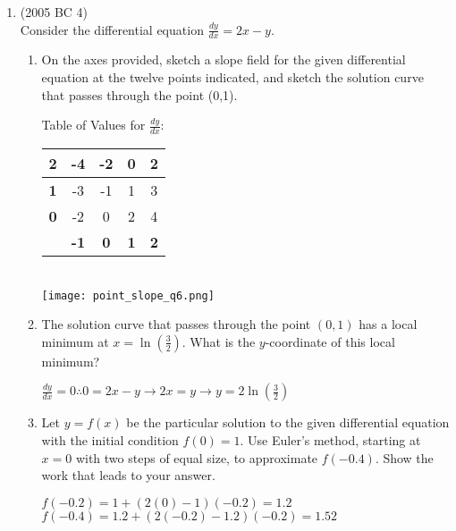 \documentclass[10pt,letterpaper]{report}
\begin{document}
\begin{enumerate}
  \item{(2005 BC 4) \\
  Consider the differential equation $\frac{dy}{dx}=2x-y$.}
  \begin{enumerate}
    \item{On the axes provided, sketch a slope field for the given differential equation at the twelve points indicated, and sketch the solution curve that passes through the point (0,1). \\}
      \begin{multicols}{2}
        Table of Values for $\frac{dy}{dx}$: \\
        \begin{tabular}{| c | c | c | c | c |} 
          \hline
          \textbf{2} & -4 & -2 & 0 & 2 \\
          \hline
          \textbf{1} & -3 & -1 & 1 & 3 \\
          \hline
          \textbf{0} & -2 & 0 & 2 & 4 \\
          \hline
           & \textbf{-1} & \textbf{0} & \textbf{1} & \textbf{2} \\
          \hline
        \end{tabular} \\
              
        \texttt{[image: point\_slope\_q6.png]}
      \end{multicols}
      
    \item{The solution curve that passes through the point $(0,1)$ has a local minimum at $x=\ln{\left(\frac{3}{2}\right)}$. What is the $y$-coordinate of this local minimum? \\}
    
      $\frac{dy}{dx}=0\therefore 0=2x-y\rightarrow 2x=y\rightarrow y=2\ln{\left(\frac{3}{2}\right)}$ \\
      
    \item{Let $y=f(x)$ be the particular solution to the given differential equation with the initial condition $f(0)=1$. Use Euler's method, starting at $x=0$ with two steps of equal size, to approximate $f(-0.4)$. Show the work that leads to your answer. \\}
    
      $f(-0.2)=1+(2(0)-1)(-0.2)=1.2$ \\
      
      $f(-0.4)=1.2+(2(-0.2)-1.2)(-0.2)=1.52$ \\
      

\end{enumerate}
\end{enumerate}
\end{document}
